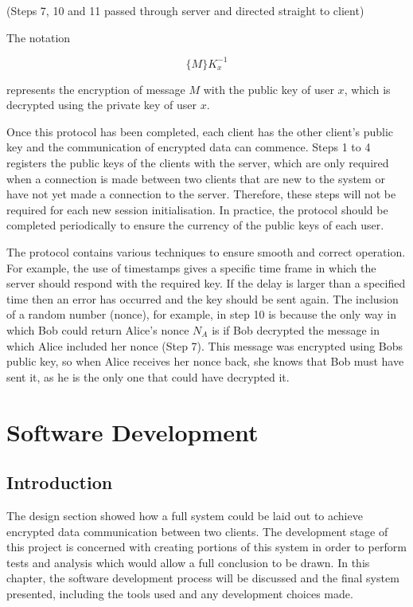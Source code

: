 \documentclass[a4paper,10pt]{report}
\begin{document}
(Steps 7, 10 and 11 passed through server and directed straight to client)

The notation

\[ \{M\}K_{x}^{-1} \]

represents the encryption of message $M$ with the public key of user $x$, which is decrypted using the private key of user $x$.

Once this protocol has been completed, each client has the other client’s public key and the communication of encrypted data can commence. Steps 1 to 4 registers the public keys of the clients with the server, which are only required when a connection is made between two clients that are new to the system or have not yet made a connection to the server. Therefore, these steps will not be required for each new session initialisation. In practice, the protocol should be completed periodically to ensure the currency of the public keys of each user. 

The protocol contains various techniques to ensure smooth and correct operation. For example, the use of timestamps gives a specific time frame in which the server should respond with the required key. If the delay is larger than a specified time then an error has occurred and the key should be sent again. The inclusion of a random number (nonce), for example, in step 10 is because the only way in which Bob could return Alice's nonce $N_{A}$ is if Bob decrypted the message in which Alice included her nonce (Step 7). This message was encrypted using Bobs public key, so when Alice receives her nonce back, she knows that Bob must have sent it, as he is the only one that could have decrypted it. 

\chapter{Software Development}

\section{Introduction}

The design section showed how a full system could be laid out to achieve encrypted data communication between two clients. The development stage of this project is concerned with creating portions of this system in order to perform tests and analysis which would allow a full conclusion to be drawn. In this chapter, the software development process will be discussed and the final system presented, including the tools used and any development choices made.
\end{document}
